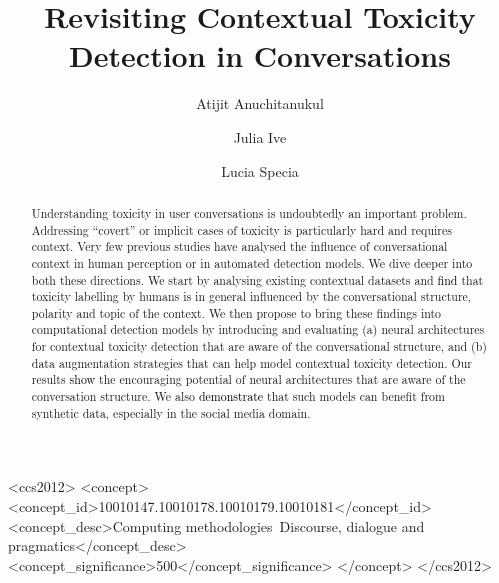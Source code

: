 \documentclass[acmsmall]{acmart}
\newcommand{\red}[1]{\textcolor{black}{#1}}
\begin{document}
\title{Revisiting Contextual Toxicity Detection in Conversations}

\author{Atijit Anuchitanukul}


\author{Julia Ive}
\authornotemark[1]

\author{Lucia Specia}





\renewcommand{\shortauthors}{Anonymous}


\begin{abstract}
Understanding toxicity in user conversations is undoubtedly an important problem. Addressing ``covert'' or implicit cases of toxicity is particularly hard and requires context. Very few previous studies have analysed the influence of conversational context in human perception or in automated detection models. We dive deeper into both these directions. We start by analysing existing contextual datasets and \red{find} that toxicity labelling by humans is in general influenced by the conversational structure, polarity and topic of the context. We then propose to bring these findings into computational detection models by introducing and evaluating (a) neural architectures for contextual toxicity detection that are aware of the conversational structure, and (b) data augmentation strategies that can help model contextual toxicity detection. Our results \red{show} the encouraging potential of neural architectures that are aware of the conversation structure. We also \red{demonstrate} that such models can benefit from synthetic data, especially in the social media domain.
\end{abstract}

\begin{CCSXML}
<ccs2012>
   <concept>
       <concept_id>10010147.10010178.10010179.10010181</concept_id>
       <concept_desc>Computing methodologies~Discourse, dialogue and pragmatics</concept_desc>
       <concept_significance>500</concept_significance>
       </concept>
 </ccs2012>
\end{CCSXML}

\end{document}
